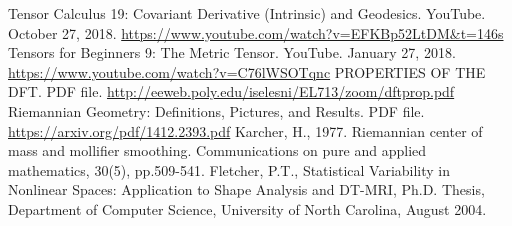 \documentclass[a4paper]{article}
\theoremstyle{definition}
\theoremstyle{plain}
\begin{document}
\begin{thebibliography}{99}
 Tensor Calculus 19: Covariant Derivative (Intrinsic) and Geodesics. YouTube. October 27, 2018. \url{https://www.youtube.com/watch?v=EFKBp52LtDM&t=146s}
 Tensors for Beginners 9: The Metric Tensor. YouTube. January 27, 2018. \url{https://www.youtube.com/watch?v=C76lWSOTqnc}
 PROPERTIES OF THE DFT. PDF file. \url{http://eeweb.poly.edu/iselesni/EL713/zoom/dftprop.pdf}
 Riemannian Geometry: Definitions, Pictures, and Results. PDF file. \url{https://arxiv.org/pdf/1412.2393.pdf}
 Karcher, H., 1977. Riemannian center of mass and mollifier smoothing. Communications on pure and applied mathematics, 30(5), pp.509-541.
Fletcher, P.T., Statistical Variability in Nonlinear Spaces: Application to Shape Analysis and DT-MRI, Ph.D. Thesis, Department of Computer Science, University of North Carolina, August 2004.
\end{thebibliography}
\end{document}
